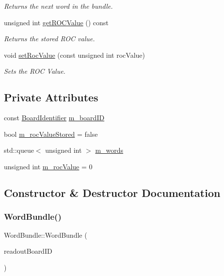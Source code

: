 \begin{DoxyCompactItemize}
\begin{DoxyCompactList}\small\item\em Returns the next word in the bundle. \end{DoxyCompactList}\item 
unsigned int \hyperlink{class_word_bundle_ad2c91f230ac93d19900eba6b2c64d0e9}{get\+R\+O\+C\+Value} () const
\begin{DoxyCompactList}\small\item\em Returns the stored R\+OC value. \end{DoxyCompactList}\item 
void \hyperlink{class_word_bundle_a15e13fdd7380c72be2f42013560d62c3}{set\+Roc\+Value} (const unsigned int roc\+Value)
\begin{DoxyCompactList}\small\item\em Sets the R\+OC Value. \end{DoxyCompactList}\end{DoxyCompactItemize}
\subsection*{Private Attributes}
\begin{DoxyCompactItemize}
\item 
const \hyperlink{class_board_identifier}{Board\+Identifier} \hyperlink{class_word_bundle_a77d34b8fe38566bc2b3144675aa53c77}{m\+\_\+board\+ID}
\item 
bool \hyperlink{class_word_bundle_a7605157c872054d7ab42b590fac97ca7}{m\+\_\+roc\+Value\+Stored} = false
\item 
std\+::queue$<$ unsigned int $>$ \hyperlink{class_word_bundle_a58233a5455b9a594e3441dd79e3d6a3b}{m\+\_\+words}
\item 
unsigned int \hyperlink{class_word_bundle_a2510a567b83584e8b53395168d53c401}{m\+\_\+roc\+Value} = 0
\end{DoxyCompactItemize}


\subsection{Constructor \& Destructor Documentation}
\mbox{\label{class_word_bundle_a7c01d89d6ce8c10d23c1134661f2c44a}} 
\subsubsection{\texorpdfstring{Word\+Bundle()}{WordBundle()}}
{\footnotesize\ttfamily Word\+Bundle\+::\+Word\+Bundle (\begin{DoxyParamCaption}\item[{const \hyperlink{class_board_identifier}{Board\+Identifier}}]{readout\+Board\+ID }\end{DoxyParamCaption})}



